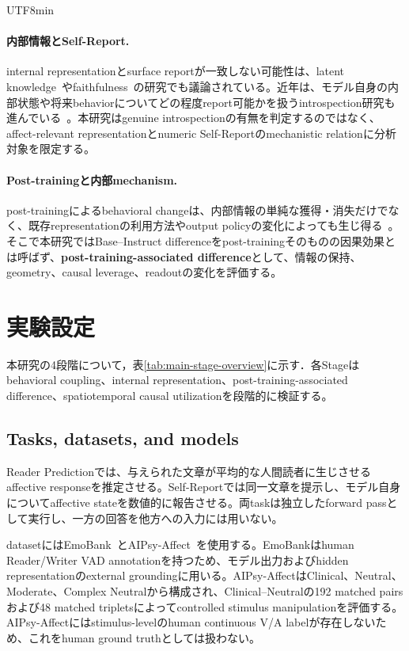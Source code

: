 \documentclass{article} %
\begin{document}
\begin{CJK*}{UTF8}{min}
\paragraph{内部情報とSelf-Report.}
internal representationとsurface reportが一致しない可能性は、latent knowledge~\citep{burns2022discovering}やfaithfulness~\citep{turpin2023language}の研究でも議論されている。近年は、モデル自身の内部状態や将来behaviorについてどの程度report可能かを扱うintrospection研究も進んでいる~\citep{binder2025looking,lindsey2026emergent,martorell2026quantitative,singh2026can}。本研究はgenuine introspectionの有無を判定するのではなく、affect-relevant representationとnumeric Self-Reportのmechanistic relationに分析対象を限定する。

\paragraph{Post-trainingと内部mechanism.}
post-trainingによるbehavioral changeは、内部情報の単純な獲得・消失だけでなく、既存representationの利用方法やoutput policyの変化によっても生じ得る~\citep{sharma2024towards,ferrando2025know}。そこで本研究ではBase--Instruct differenceをpost-trainingそのものの因果効果とは呼ばず、\textbf{post-training-associated difference}として、情報の保持、geometry、causal leverage、readoutの変化を評価する。


\section{実験設定}
\label{sec:main-methods}
本研究の4段階について，表\ref{tab:main-stage-overview}に示す．各Stageはbehavioral coupling、internal representation、post-training-associated difference、spatiotemporal causal utilizationを段階的に検証する。
\subsection{Tasks, datasets, and models}

Reader Predictionでは、与えられた文章が平均的な人間読者に生じさせるaffective responseを推定させる。Self-Reportでは同一文章を提示し、モデル自身についてaffective stateを数値的に報告させる。両taskは独立したforward passとして実行し、一方の回答を他方への入力には用いない。

datasetにはEmoBank~\citep{buechel2017emobank}とAIPsy-Affect~\citep{keeman2026aipsy,keido_labs_2026}を使用する。EmoBankはhuman Reader/Writer VAD annotationを持つため、モデル出力およびhidden representationのexternal groundingに用いる。AIPsy-AffectはClinical、Neutral、Moderate、Complex Neutralから構成され、Clinical--Neutralの192 matched pairsおよび48 matched tripletsによってcontrolled stimulus manipulationを評価する。AIPsy-Affectにはstimulus-levelのhuman continuous V/A labelが存在しないため、これをhuman ground truthとしては扱わない。


\end{CJK*}
\end{document}
